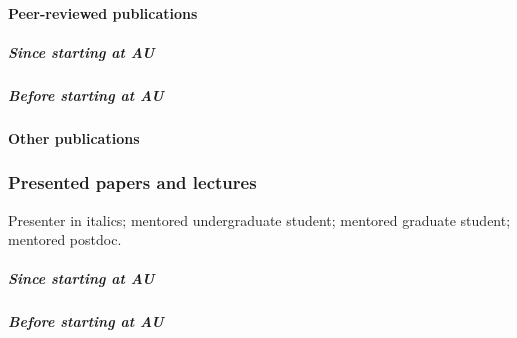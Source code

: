 \paragraph{Peer-reviewed publications}

\subparagraph{Since starting at AU}
\nocite{*}
\printbibliography[filter=cvpapers, check=afteraustart, heading=none]

\subparagraph{Before starting at AU}
\nocite{*}
\printbibliography[filter=cvpapers, check=beforeaustart, heading=none]

\paragraph{Other publications}


\subsubsection{Presented papers and lectures}
Presenter in italics;
\ugsymbol{}mentored undergraduate student;
\phdsymbol{}mentored graduate student;
\postdocsymbol{}mentored postdoc.

% 
\subparagraph{Since starting at AU}
\nocite{*}
\printbibliography[filter=aupresentation, heading=none]

\subparagraph{Before starting at AU}
\nocite{*}
\printbibliography[filter=beforeaupresentation, heading=none]





